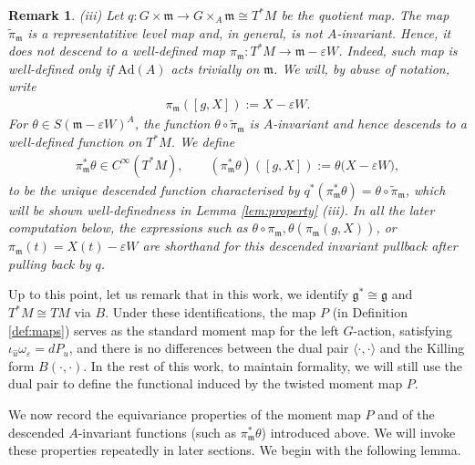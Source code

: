 \documentclass[11pt]{amsart}
\theoremstyle{definition}
\theoremstyle{plain}
\newtheorem{remark}[theorem]{Remark}
\theoremstyle{conclusion}
\begin{document}
\begin{remark}
(iii) %
Let $q:G\times\mathfrak{m}\to G\times_A\mathfrak{m}\cong T^*M$ be the quotient map. The map $\widetilde{\pi}_{\mathfrak{m}}$ is a representatitive level map and, in general, is not $A$-invariant. Hence, it does \emph{not} descend to a well-defined map $\pi_\mathfrak{m}: T^*M\to\mathfrak{m}-\varepsilon W$. Indeed, such map is well-defined only if $\mathrm{Ad}(A)$ acts trivially on $\mathfrak{m}$. We will, by abuse of notation, write \begin{align*}
\pi_{\mathfrak{m}}([g,X]) := X-\varepsilon W.
\end{align*}
For $\theta\in S(\mathfrak{m}-\varepsilon W)^A$, the function $\theta\circ\widetilde{\pi}_{\mathfrak{m}}$ is $A$-invariant and hence descends to a well-defined function on $T^*M$. We define  \begin{align*}
\pi_{\mathfrak{m}}^*\theta\in C^{\infty}(T^*M),\qquad (\pi_{\mathfrak{m}}^*\theta)([g,X]) := \theta\bigl(X-\varepsilon W\bigr),
\end{align*} to be the unique descended function characterised by $q^*(\pi_\mathfrak{m}^*\theta) = \theta \circ \widetilde{\pi}_\mathfrak{m}$, which will be shown well-definedness in Lemma \ref{lem:property} \textup{(iii)}. In all the later computation below, the expressions such as $\theta \circ \pi_\mathfrak{m},  \theta(\pi_{\mathfrak{m}}(g,X))$, or $\pi_{\mathfrak{m}}(t)=X(t)-\varepsilon W$ are shorthand for this descended invariant pullback after pulling back by $q$.
\end{remark}

Up to this point, let us remark that in this work, we identify $\mathfrak{g}^* \cong \mathfrak{g}$ and $T^*M \cong TM$ via $B$. Under these identifications, the map $P$ (in Definition \ref{def:maps}) serves as the standard moment map for the left $G$-action, satisfying $\iota_{\widehat{u}} \omega_\varepsilon = d P_u$, and there is no differences between the dual pair $\langle \cdot,\cdot \rangle$ and the Killing form $B(\cdot,\cdot)$. In the rest of this work, to maintain formality, we will still use the dual pair to define the functional induced by the twisted moment map $P$.

We now record the equivariance properties of the moment map $P$ and of the descended $A$-invariant functions (such as $\pi_{\mathfrak{m}}^*\theta$) introduced above. We will invoke these properties repeatedly in later sections. We begin with the following lemma.
\end{document}
